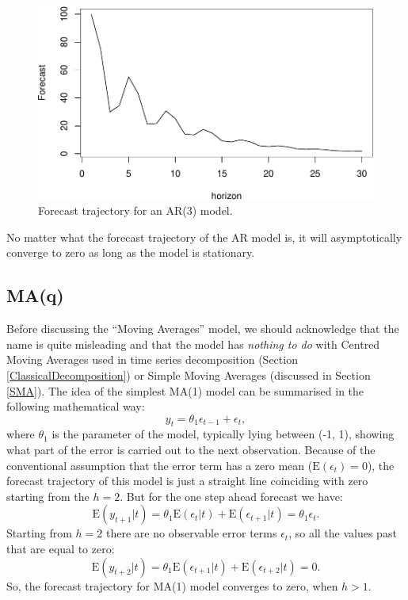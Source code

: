 \documentclass[]{book}
\theoremstyle{definition}
\theoremstyle{definition}
\theoremstyle{definition}
\theoremstyle{definition}
\theoremstyle{remark}
\begin{document}
\begin{figure}
\centering
\includegraphics{Svetunkov--2022----ADAM_files/figure-latex/AR3Trajectory-1.pdf}
\caption{\label{fig:AR3Trajectory}Forecast trajectory for an AR(3) model.}
\end{figure}

No matter what the forecast trajectory of the AR model is, it will asymptotically converge to zero as long as the model is stationary.

\hypertarget{MA}{%
\subsection{MA(q)}\label{MA}}

Before discussing the ``Moving Averages'' model, we should acknowledge that the name is quite misleading and that the model has \emph{nothing to do} with Centred Moving Averages used in time series decomposition (Section \ref{ClassicalDecomposition}) or Simple Moving Averages (discussed in Section \ref{SMA}). The idea of the simplest MA(1) model can be summarised in the following mathematical way:
\begin{equation}
  {y}_{t} = \theta_1 \epsilon_{t-1} + \epsilon_t ,
  \label{eq:ARIMA001Example}
\end{equation}
where \(\theta_1\) is the parameter of the model, typically lying between (-1, 1), showing what part of the error is carried out to the next observation. Because of the conventional assumption that the error term has a zero mean (\(\mathrm{E}(\epsilon_{t})=0\)), the forecast trajectory of this model is just a straight line coinciding with zero starting from the \(h=2\). But for the one step ahead forecast we have:
\begin{equation}
  \mathrm{E}({y}_{t+1}|t) = \theta_1 \mathrm{E}(\epsilon_{t}|t) + \mathrm{E}(\epsilon_{t+1}|t) = \theta_1 \epsilon_{t}.
  \label{eq:ARIMA001ExampleForecast}
\end{equation}
Starting from \(h=2\) there are no observable error terms \(\epsilon_t\), so all the values past that are equal to zero:
\begin{equation}
  \mathrm{E}({y}_{t+2}|t) = \theta_1 \mathrm{E}(\epsilon_{t+1}|t) + \mathrm{E}(\epsilon_{t+2}|t) = 0.
  \label{eq:ARIMA001ExampleForecastInSample}
\end{equation}
So, the forecast trajectory for MA(1) model converges to zero, when \(h>1\).
\end{document}
